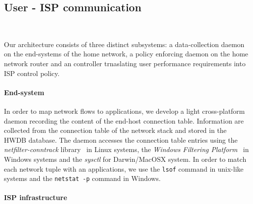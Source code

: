 

\subsection{User - ISP communication} ~\label{s:qos:architecture}

Our architecture consists of three distinct subsystems: a data-collection daemon
on the end-systems of the home network, a policy enforcing daemon on the home
network router and an \of controller trnaslating user performance requirements
into ISP control policy.

\paragraph*{End-system}

In order to map network flows to applications, we develop a light cross-platform
daemon recording the content of the end-host connection table.
Information are collected from the connection table of the network
stack and stored in the HWDB database. The daemon accesses the connection table
entries using the {\it netfilter-conntrack} library~\cite{netfilter} in Linux systems,
the {\it Windows Filtering Platform}~\cite{win-wfp} in Windows systems and the
{\it sysctl} \/for Darwin/MacOSX system. 
In order to match each network tuple
with an applications, we use the {\tt lsof} command in unix-like
systems and the {\tt netstat -p} command in Windows.

\paragraph*{ISP infrastructure}

